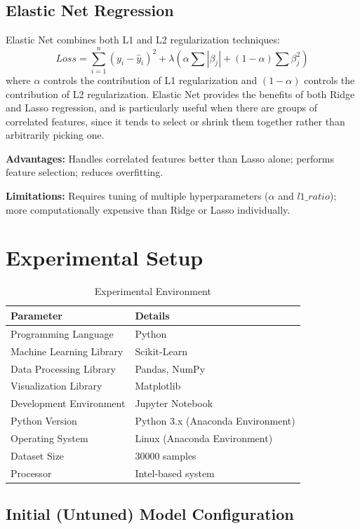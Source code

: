 \documentclass[12pt,a4paper]{article}
\begin{document}
\subsection{Elastic Net Regression}

Elastic Net combines both L1 and L2 regularization techniques:
\[
Loss = \sum_{i=1}^{n}(y_i-\hat{y}_i)^2 + \lambda\left(\alpha\sum|\beta_j| + (1-\alpha)\sum\beta_j^2\right)
\]
where $\alpha$ controls the contribution of L1 regularization and $(1-\alpha)$ controls the contribution of L2 regularization. Elastic Net provides the benefits of both Ridge and Lasso regression, and is particularly useful when there are groups of correlated features, since it tends to select or shrink them together rather than arbitrarily picking one.

\textbf{Advantages:} Handles correlated features better than Lasso alone; performs feature selection; reduces overfitting.

\textbf{Limitations:} Requires tuning of multiple hyperparameters ($\alpha$ and $l1\_ratio$); more computationally expensive than Ridge or Lasso individually.

\section{Experimental Setup}

\begin{table}[H]
\centering
\begin{tabular}{ll}
\toprule
Parameter & Details \\
\midrule
Programming Language & Python \\
Machine Learning Library & Scikit-Learn \\
Data Processing Library & Pandas, NumPy \\
Visualization Library & Matplotlib \\
Development Environment & Jupyter Notebook \\
Python Version & Python 3.x (Anaconda Environment) \\
Operating System & Linux (Anaconda Environment) \\
Dataset Size & 30000 samples \\
Processor & Intel-based system \\
\bottomrule
\end{tabular}
\caption{Experimental Environment}
\end{table}

\subsection*{Initial (Untuned) Model Configuration}
\end{document}
